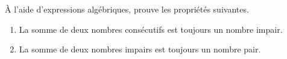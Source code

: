 %
%
    À l'aide d'expressions algébriques, prouve les propriétés suivantes.
    \begin{enumerate}[itemsep=4cm]
        \item La somme de deux nombres consécutifs est toujours un nombre impair.
        \item La somme de deux nombres impairs est toujours un nombre pair.
    \end{enumerate}
    \vspace*{4cm}
